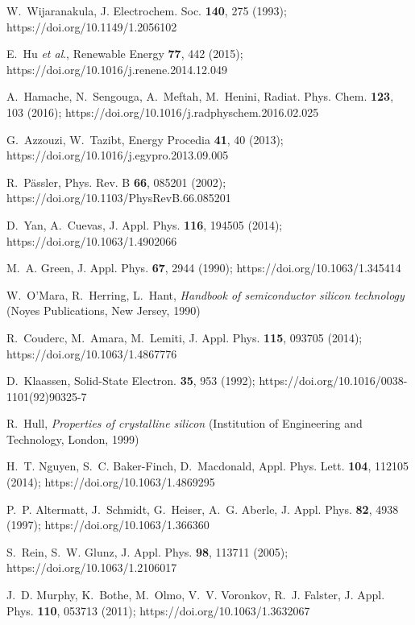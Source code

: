﻿\documentclass[12pt]{article}
\begin{document}
\begin{thebibliography}{99}
W.~Wijaranakula, J. Electrochem. Soc. \textbf{140}, 275 (1993);
https://doi.org/10.1149/1.2056102

E.~Hu \emph{et al}., Renewable Energy \textbf{77}, 442 (2015);
https://doi.org/10.1016/j.renene.2014.12.049

A.~Hamache, N.~Sengouga, A.~Meftah, M.~Henini, Radiat. Phys. Chem. \textbf{123}, 103 (2016);
https://doi.org/10.1016/j.radphyschem.2016.02.025

G.~Azzouzi, W.~Tazibt, Energy Procedia \textbf{41}, 40 (2013);
https://doi.org/10.1016/j.egypro.2013.09.005

R.~P\"assler, Phys. Rev. B \textbf{66}, 085201 (2002);
https://doi.org/10.1103/PhysRevB.66.085201

D.~Yan, A.~Cuevas, J. Appl. Phys. \textbf{116}, 194505 (2014);
https://doi.org/10.1063/1.4902066

M.~A. Green, J. Appl. Phys. \textbf{67}, 2944 (1990);
https://doi.org/10.1063/1.345414

W.~O'Mara, R.~Herring, L.~Hant, \emph{Handbook of semiconductor silicon technology}
(Noyes Publications, New Jersey, 1990)

R.~Couderc, M.~Amara, M.~Lemiti, J. Appl. Phys. \textbf{115}, 093705 (2014);
https://doi.org/10.1063/1.4867776

D.~Klaassen, Solid-State Electron. \textbf{35}, 953 (1992);
https://doi.org/10.1016/0038-1101(92)90325-7

R.~Hull, \emph{Properties of crystalline silicon} (Institution of Engineering and
  Technology, London, 1999)

H.~T. Nguyen, S.~C. Baker-Finch, D.~Macdonald, Appl. Phys. Lett. \textbf{104}, 112105 (2014);
https://doi.org/10.1063/1.4869295

P.~P. Altermatt, J.~Schmidt, G.~Heiser, A.~G. Aberle,
J. Appl. Phys. \textbf{82}, 4938 (1997);
https://doi.org/10.1063/1.366360

S.~Rein, S.~W. Glunz, J. Appl. Phys.
  \textbf{98}, 113711 (2005);
  https://doi.org/10.1063/1.2106017

J.~D. Murphy, K.~Bothe, M.~Olmo, V.~V. Voronkov, R.~J. Falster,
 J. Appl. Phys. \textbf{110}, 053713 (2011);
https://doi.org/10.1063/1.3632067


\end{thebibliography}
\end{document}
